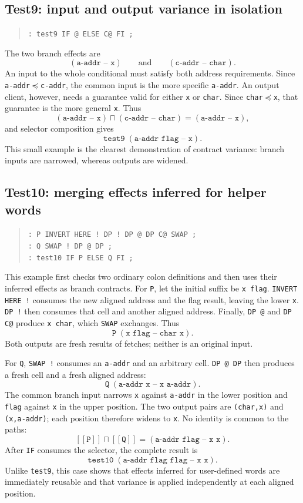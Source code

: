 \documentclass[11pt,a4paper]{article}
\newcommand{\meet}{\mathbin{\sqcap}}
\newcommand{\sem}[1]{[\![#1]\!]}
\begin{document}
\subsection{Test9: input and output variance in isolation}

\begin{quote}
\texttt{: test9  IF @ ELSE C@ FI ;}
\end{quote}
The two branch effects are
\[
 (\texttt{a-addr -- x})
 \qquad\text{and}\qquad
 (\texttt{c-addr -- char}).
\]
An input to the whole conditional must satisfy both address requirements.
Since \texttt{a-addr}$\preceq$\texttt{c-addr}, the common input is the more
specific \texttt{a-addr}.  An output client, however, needs a guarantee valid
for either \texttt{x} or \texttt{char}.  Since
\texttt{char}$\preceq$\texttt{x}, that guarantee is the more general
\texttt{x}.  Thus
\[
 (\texttt{a-addr -- x})\meet(\texttt{c-addr -- char})
       =(\texttt{a-addr -- x}),
\]
and selector composition gives
\[
               \texttt{test9}\;(\texttt{a-addr flag -- x}).
\]
This small example is the clearest demonstration of contract variance:
branch inputs are narrowed, whereas outputs are widened.

\subsection{Test10: merging effects inferred for helper words}

\begin{quote}
\texttt{: P INVERT HERE ! DP ! DP @ DP C@ SWAP ;}\\
\texttt{: Q SWAP ! DP @ DP ;}\\
\texttt{: test10 IF P ELSE Q FI ;}
\end{quote}
This example first checks two ordinary colon definitions and then uses their
inferred effects as branch contracts.  For \texttt{P}, let the initial suffix
be \texttt{x flag}.  \texttt{INVERT HERE !} consumes the new aligned address
and the flag result, leaving the lower \texttt{x}.  \texttt{DP !} then consumes
that cell and another aligned address.  Finally, \texttt{DP @} and
\texttt{DP C@} produce \texttt{x char}, which \texttt{SWAP} exchanges.  Thus
\[
                   \texttt{P}\;(\texttt{x flag -- char x}).
\]
Both outputs are fresh results of fetches; neither is an original input.

For \texttt{Q}, \texttt{SWAP !} consumes an \texttt{a-addr} and an arbitrary
cell.  \texttt{DP @ DP} then produces a fresh cell and a fresh aligned address:
\[
                   \texttt{Q}\;(\texttt{a-addr x -- x a-addr}).
\]
The common branch input narrows \texttt{x} against \texttt{a-addr} in the
lower position and \texttt{flag} against \texttt{x} in the upper position.
The two output pairs are \texttt{(char,x)} and \texttt{(x,a-addr)}; each
position therefore widens to \texttt{x}.  No identity is common to the paths:
\[
 \sem{\texttt{P}}\meet\sem{\texttt{Q}}
       = (\texttt{a-addr flag -- x x}).
\]
After \texttt{IF} consumes the selector, the complete result is
\[
       \texttt{test10}\;(\texttt{a-addr flag flag -- x x}).
\]
Unlike \texttt{test9}, this case shows that effects inferred for user-defined
words are immediately reusable and that variance is applied independently at
each aligned position.
\end{document}
